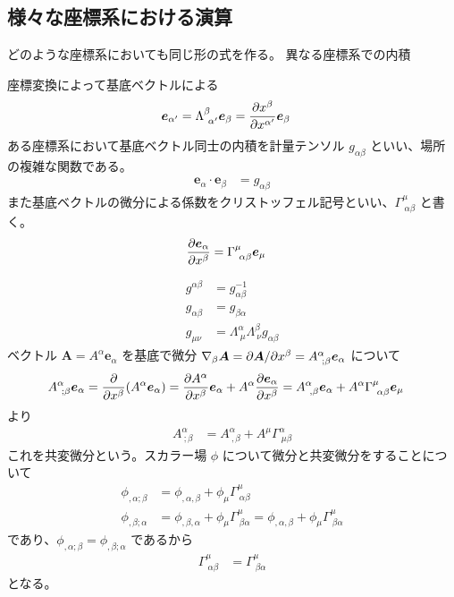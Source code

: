 \documentclass[uplatex,dvipdfmx,a4paper,11pt]{jlreq}
\renewcommand{\AA}{\bm{A}}
\newcommand{\ee}{\bm{e}}
\theoremstyle{definition}
\begin{document}
\subsection{様々な座標系における演算}
どのような座標系においても同じ形の式を作る。
異なる座標系での内積
\begin{definition}[座標系の基底ベクトル]
  座標変換によって基底ベクトルによる
  \begin{align}
    \ee_{\alpha'} & = \Lambda_{\ \alpha'}^\beta\ee_\beta = \diffp{x^\beta}{x^{\alpha'}}\ee_\beta
  \end{align}
  ある座標系において基底ベクトル同士の内積を計量テンソル $g_{\alpha\beta}$ といい、場所の複雑な関数である。
  \begin{align}
    \ee_\alpha\cdot\ee_\beta & = g_{\alpha\beta}
  \end{align}
  また基底ベクトルの微分による係数をクリストッフェル記号といい、$\Gamma^\mu_{\ \alpha\beta}$ と書く。
  \begin{align}
    \diffp{\ee_\alpha}{x^\beta} & = \Gamma^\mu_{\ \alpha\beta}\ee_\mu
  \end{align}
\end{definition}
\begin{align}
  g^{\alpha\beta} & = g_{\alpha\beta}^{-1}                                       \\
  g_{\alpha\beta} & = g_{\beta\alpha}                                            \\
  g_{\mu\nu}      & = \Lambda^\alpha_{\ \mu}\Lambda^\beta_{\ \nu}g_{\alpha\beta}
\end{align}
ベクトル $\AA = A^\alpha\ee_\alpha$ を基底で微分 $\nabla_\beta\AA = \difsp{\AA}{x^\beta} = A^\alpha_{\ ;\beta}\ee_\alpha$ について
\begin{align}
  A^\alpha_{\ ;\beta}\ee_\alpha & = \diffp{}{x^\beta}(A^\alpha\ee_\alpha) = \diffp{A^\alpha}{x^\beta}\ee_\alpha + A^\alpha\diffp{\ee_\alpha}{x^\beta} = A^\alpha_{\ ,\beta}\ee_\alpha + A^\alpha\Gamma^\mu_{\ \alpha\beta}\ee_\mu
\end{align}
より
\begin{align}
  A^\alpha_{\ ;\beta} & = A^\alpha_{\ ,\beta} + A^\mu\Gamma^\alpha_{\ \mu\beta}
\end{align}
これを共変微分という。スカラー場 $\phi$ について微分と共変微分をすることについて
\begin{align}
  \phi_{,\alpha;\beta} & = \phi_{,\alpha,\beta} + \phi_\mu\Gamma^\mu_{\ \alpha\beta}                                                             \\
  \phi_{,\beta;\alpha} & = \phi_{,\beta,\alpha} + \phi_\mu\Gamma^\mu_{\ \beta\alpha} = \phi_{,\alpha,\beta} + \phi_\mu\Gamma^\mu_{\ \beta\alpha}
\end{align}
であり、$\phi_{,\alpha;\beta} = \phi_{,\beta;\alpha}$ であるから
\begin{align}
  \Gamma^\mu_{\ \alpha\beta} & = \Gamma^\mu_{\ \beta\alpha}
\end{align}
となる。
\end{document}
